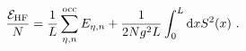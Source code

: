 \begin{equation}
\frac{{\cal E}_{\rm HF}}{N} = \frac{1}{L} \sum_{\eta,n}^{\rm occ} E_{\eta,n} + \frac{1}{2 Ng^2 L} \int_0^L
{\rm d}x S^2(x) \ .
\label{d14}
\end{equation}

